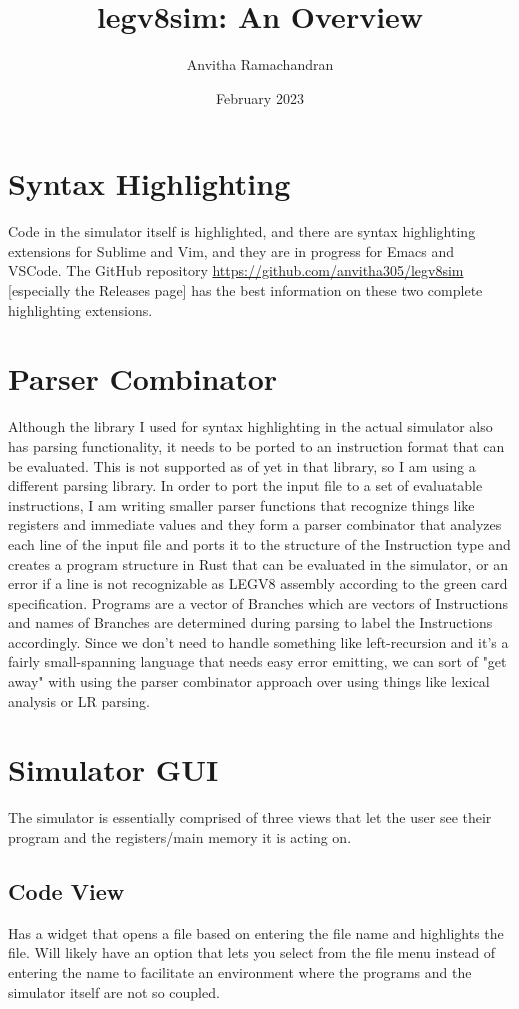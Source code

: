 \documentclass{article}
\title{legv8sim: An Overview}
\author{Anvitha Ramachandran}
\date{February 2023}
\begin{document}
\maketitle
\tableofcontents
\section{Syntax Highlighting}
Code in the simulator itself is highlighted, and there are syntax highlighting extensions for Sublime and Vim, and they are in progress for Emacs and VSCode.
The GitHub repository \url{https://github.com/anvitha305/legv8sim} [especially the Releases page] has the best information on these two complete highlighting extensions. 
\section{Parser Combinator}
Although the library I used for syntax highlighting in the actual simulator also has parsing functionality, it needs to be ported to an instruction format that can be evaluated. This is not supported as of yet in that library, so I am using a different parsing library. In order to port the input file to a set of evaluatable instructions, I am writing smaller parser functions that recognize things like registers and immediate values and they form a parser combinator that analyzes each line of the input file and ports it to the structure of the Instruction type and creates a program structure in Rust that can be evaluated in the simulator, or an error if a line is not recognizable as LEGV8 assembly according to the green card specification. Programs are a vector of Branches which are vectors of Instructions and names of Branches are determined during parsing to label the Instructions accordingly. Since we don't need to handle something like left-recursion and it's a fairly small-spanning language that needs easy error emitting, we can sort of "get away" with using the parser combinator approach over using things like lexical analysis or LR parsing.
\section{Simulator GUI}
The simulator is essentially comprised of three views that let the user see their program and the registers/main memory it is acting on.
\subsection{Code View}
Has a widget that opens a file based on entering the file name and highlights the file. Will likely have an option that lets you select from the file menu instead of entering the name to facilitate an environment where the programs and the simulator itself are not so coupled.
\end{document}
